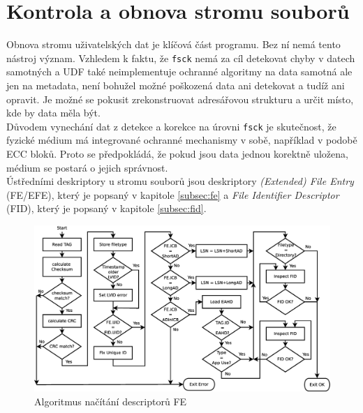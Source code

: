 \section{Kontrola a obnova stromu souborů}
\label{sec:filetree}
Obnova stromu uživatelských dat je klíčová část programu. Bez ní nemá tento nástroj význam. Vzhledem k faktu, že \texttt{fsck} nemá za cíl detekovat chyby v datech samotných a UDF také neimplementuje ochranné algoritmy na data samotná ale jen na metadata, není bohužel možné poškozená data ani detekovat a tudíž ani opravit. Je možné se pokusit zrekonstruovat adresářovou strukturu a určit místo, kde by data měla být.\\
Důvodem vynechání dat z detekce a korekce na úrovni \texttt{fsck} je skutečnost, že fyzické médium má integrované ochranné mechanismy v sobě, například v podobě ECC bloků. Proto se předpokládá, že pokud jsou data jednou korektně uložena, médium se postará o jejich správnost.\\
Ústředními deskriptory u stromu souborů jsou deskriptory \textit{(Extended) File Entry} (FE/EFE), který je popsaný v kapitole \ref{subsec:fe} a \textit{File Identifier Descriptor} (FID), který je popsaný v kapitole \ref{subsec:fid}.\\ 
\begin{figure}[] 
    \centering
    \includegraphics[scale=0.36]{obrazky/get-file.eps}
    \caption{Algoritmus načítání descriptorů FE}
    \label{fig:files}
\end{figure}
